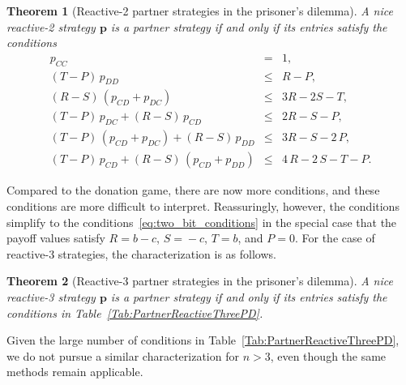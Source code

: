 \documentclass[9pt,twoside,lineno]{pnas-new}
\theoremstyle{plainCl1}
\newtheorem{theorem}{Theorem}
\theoremstyle{plainCl2}
\begin{document}

\begin{theorem}[Reactive-2 partner strategies in the prisoner's dilemma]
\label{theorem:reactive_two_partner_strategies_PD}
A nice reactive-2 strategy $\mathbf{p}$ is a partner strategy if and only if its entries satisfy the conditions
\begin{equation}
  \begin{array}{rcl}
    p_{CC} & = & 1, \\
    (T - P)\, p_{DD} & \le & R - P, \\ 
    (R - S)\, (p_{CD} + p_{DC}) & \le & 3 R - 2 S - T, \\
    (T - P)\, p_{DC}  + (R - S)\, p_{CD} & \le & 2 R - S - P, \\ 
    (T - P)\, (p_{CD} + p_{DC}) + (R - S)\, p_{DD}  & \le & 3 R - S - 2\,P, \\
    (T - P)\, p_{CD}  + (R - S)\, (p_{CD} + p_{DD}) & \le & 4\,R - 2\,S  - T- P.
\end{array}
\end{equation}
\end{theorem}

\noindent
Compared to the donation game, there are now more conditions, and these conditions are more difficult to interpret. Reassuringly, however, the conditions simplify to the conditions~\eqref{eq:two_bit_conditions} in the special case that the payoff values satisfy $R\!=\!b\!-\!c$, $S\!=\!-c$, $T\!=\!b$, and $P\!=\!0$. 
For the case of reactive-3 strategies, the characterization is as follows. 



\begin{theorem}[Reactive-3 partner strategies in the prisoner's dilemma]
\label{theorem:reactive_three_partner_strategies_PD}
A nice reactive-3 strategy $\mathbf{p}$ is a partner strategy if and only if its entries satisfy the conditions in Table~\ref{Tab:PartnerReactiveThreePD}. 
\end{theorem}

\noindent
Given the large number of conditions in Table~\ref{Tab:PartnerReactiveThreePD}, we do not pursue a similar characterization for $n\!>\!3$, even though the same methods remain applicable. \\
\end{document}
